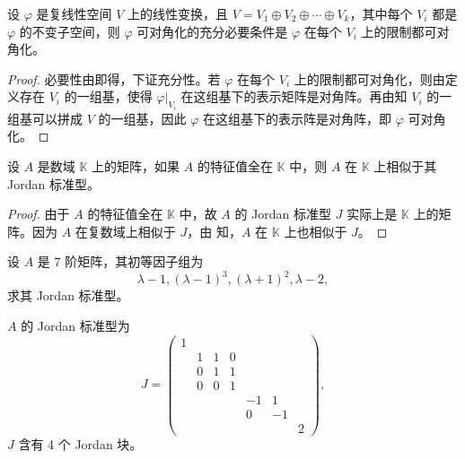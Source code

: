 \documentclass[../../main.tex]{subfiles}%
\begin{document}
\begin{corollary}\label{corollary:线性变换可对角化关于在直和分解限制的充要条件}
设 $\varphi$ 是复线性空间 $V$ 上的线性变换，且 $V = V_1\oplus V_2\oplus\cdots\oplus V_k$，其中每个 $V_i$ 都是 $\varphi$ 的不变子空间，则 $\varphi$ 可对角化的充分必要条件是 $\varphi$ 在每个 $V_i$ 上的限制都可对角化。
\end{corollary}
\begin{proof}

必要性由即得，下证充分性。若 $\varphi$ 在每个 $V_i$ 上的限制都可对角化，则由定义存在 $V_i$ 的一组基，使得 $\varphi|_{V_i}$ 在这组基下的表示矩阵是对角阵。再由知 $V_i$ 的一组基可以拼成 $V$ 的一组基，因此 $\varphi$ 在这组基下的表示阵是对角阵，即 $\varphi$ 可对角化。

\end{proof}

\begin{corollary}
设 $A$ 是数域 $\mathbb{K}$ 上的矩阵，如果 $A$ 的特征值全在 $\mathbb{K}$ 中，则 $A$ 在 $\mathbb{K}$ 上相似于其 Jordan 标准型。
\end{corollary}
\begin{proof}

由于 $A$ 的特征值全在 $\mathbb{K}$ 中，故 $A$ 的 Jordan 标准型 $J$ 实际上是 $\mathbb{K}$ 上的矩阵。因为 $A$ 在复数域上相似于 $J$，由 知，$A$ 在 $\mathbb{K}$ 上也相似于 $J$。

\end{proof}

\begin{example}
设 $A$ 是 7 阶矩阵，其初等因子组为
\[
\lambda - 1, (\lambda - 1)^3, (\lambda + 1)^2, \lambda - 2,
\]
求其 Jordan 标准型。
\end{example}
\begin{solution}

$A$ 的 Jordan 标准型为
\[
J = \begin{pmatrix}
1 & & & & & & \\
& 1 & 1 & 0 & & & \\
& 0 & 1 & 1 & & & \\
& 0 & 0 & 1 & & & \\
& & & & -1 & 1 & \\
& & & & 0 & -1 & \\
& & & & & & 2
\end{pmatrix},
\]
$J$ 含有 4 个 Jordan 块。

\end{solution}
\end{document}
